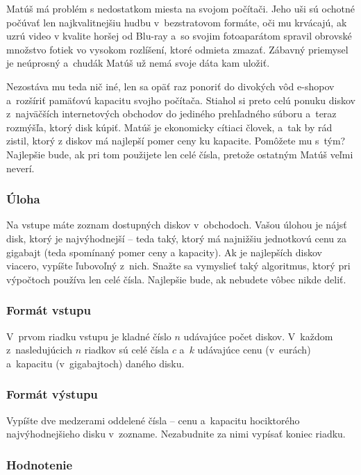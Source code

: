 Matúš má problém s nedostatkom miesta na svojom počítači. Jeho uši sú ochotné počúvať len najkvalitnejšiu
hudbu v~bezstratovom formáte, oči mu krvácajú, ak uzrú video v kvalite horšej od Blu-ray a~so svojim
fotoaparátom spravil obrovské množstvo fotiek vo vysokom rozlíšení, ktoré odmieta zmazať. Zábavný priemysel
je neúprosný a~chudák Matúš už nemá svoje dáta kam uložiť.

Nezostáva mu teda nič iné, len sa opäť raz ponoriť do divokých vôd e-shopov a~rozšíriť pamäťovú kapacitu svojho počítača.
Stiahol si preto celú ponuku diskov z~najväčších internetových obchodov do jediného prehľadného súboru
a~teraz rozmýšľa, ktorý disk kúpiť. Matúš je ekonomicky cítiaci človek, a~tak by rád zistil, ktorý z diskov má najlepší pomer ceny ku kapacite.
Pomôžete mu s~tým? Najlepšie bude, ak pri tom použijete len celé čísla, pretože ostatným Matúš veľmi neverí.

\subsubsection{Úloha}

Na vstupe máte zoznam dostupných diskov v~obchodoch. Vašou úlohou je nájsť disk, ktorý je najvýhodnejší -- teda taký,
ktorý má najnižšiu jednotkovú cenu za gigabajt (teda spomínaný pomer ceny a kapacity).
Ak je najlepších diskov viacero, vypíšte ľubovoľný z~nich. Snažte sa vymyslieť taký algoritmus, ktorý pri výpočtoch
používa len celé čísla. Najlepšie bude, ak nebudete vôbec nikde deliť.

\subsubsection{Formát vstupu}

V~prvom riadku vstupu je kladné číslo $n$ udávajúce počet diskov.
V~každom z~nasledujúcich $n$ riadkov sú celé čísla $c$ a~$k$ udávajúce cenu (v~eurách)
a~kapacitu (v~gigabajtoch) daného disku.

\subsubsection{Formát výstupu}

Vypíšte dve medzerami oddelené čísla -- cenu a~kapacitu hociktorého najvýhodnejšieho disku v~zozname.
Nezabudnite za nimi vypísať koniec riadku.

\subsubsection{Hodnotenie}

